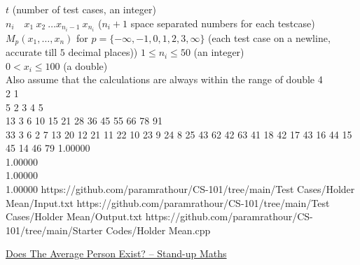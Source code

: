 \documentclass[../../Problems]{subfiles}
\begin{document}
\begin{testcasesMore}
	{$t$ \hfill(number of test cases, an integer)\\
	$n_i\quad x_1\ x_2\ \ldots x_{n_i-1}\ x_{n_i}$ \hfill($n_i+1$ space separated numbers for each testcase)}
	{$M_{p}(x_{1},\dots ,x_{n})$ for $p=\{-\infty, -1, 0, 1, 2, 3, \infty\}$ \hfill{(each test case on a newline, accurate till $5$ decimal places))}}
	{$1 \leq n_i \leq 50$ \hfill{(an integer)}\\
	$0 < x_i \leq 100$ \hfill{(a double)}\\
	Also assume that the calculations are always within the range of double}
	{4\\2 1\\5 2 3 4 5\\13 3 6 10 15 21 28 36 45 55 66 78 91\\33 3 6 2 7 13 20 12 21 11 22 10 23 9 24 8 25 43 62 42 63 41 18 42 17 43 16 44 15 45 14 46 79}
	{1.00000\\1.00000\\1.00000\\1.00000}
	{https://github.com/paramrathour/CS-101/tree/main/Test Cases/Holder Mean/Input.txt}
	{https://github.com/paramrathour/CS-101/tree/main/Test Cases/Holder Mean/Output.txt}
	{https://github.com/paramrathour/CS-101/tree/main/Starter Codes/Holder Mean.cpp}
\end{testcasesMore}
\begin{funvideo}
\href{https://youtu.be/NbiveCNBOxk}{Does The Average Person Exist? -- Stand-up Maths}
\end{funvideo}
\end{document}
